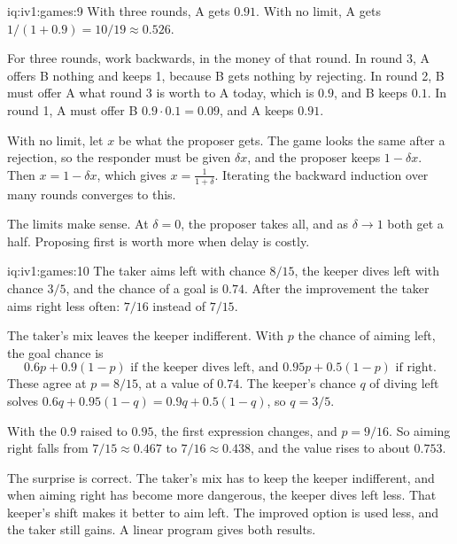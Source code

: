 \begin{solution}{iq:iv1:games:9}
With three rounds, A gets $0.91$. With no limit, A gets $1/(1 + 0.9) = 10/19 \approx 0.526$.

For three rounds, work backwards, in the money of that round. In round 3, A offers B nothing and keeps 1, because B gets nothing by rejecting. In round 2, B must offer A what round 3 is worth to A today, which is $0.9$, and B keeps $0.1$. In round 1, A must offer B $0.9 \cdot 0.1 = 0.09$, and A keeps $0.91$.

With no limit, let $x$ be what the proposer gets. The game looks the same after a rejection, so the responder must be given $\delta x$, and the proposer keeps $1 - \delta x$. Then $x = 1 - \delta x$, which gives $x = \frac{1}{1 + \delta}$. Iterating the backward induction over many rounds converges to this.

The limits make sense. At $\delta = 0$, the proposer takes all, and as $\delta \to 1$ both get a half. Proposing first is worth more when delay is costly.

\end{solution}

\begin{solution}{iq:iv1:games:10}
The taker aims left with chance $8/15$, the keeper dives left with chance $3/5$, and the chance of a goal is $0.74$. After the improvement the taker aims right less often: $7/16$ instead of $7/15$.

The taker's mix leaves the keeper indifferent. With $p$ the chance of aiming left, the goal chance is
\[
0.6p + 0.9(1 - p) \text{ if the keeper dives left, and } 0.95p + 0.5(1 - p) \text{ if right.}
\]
These agree at $p = 8/15$, at a value of $0.74$. The keeper's chance $q$ of diving left solves $0.6q + 0.95(1 - q) = 0.9q + 0.5(1 - q)$, so $q = 3/5$.

With the $0.9$ raised to $0.95$, the first expression changes, and $p = 9/16$. So aiming right falls from $7/15 \approx 0.467$ to $7/16 \approx 0.438$, and the value rises to about $0.753$.

The surprise is correct. The taker's mix has to keep the keeper indifferent, and when aiming right has become more dangerous, the keeper dives left less. That keeper's shift makes it better to aim left. The improved option is used less, and the taker still gains. A linear program gives both results.

\end{solution}

